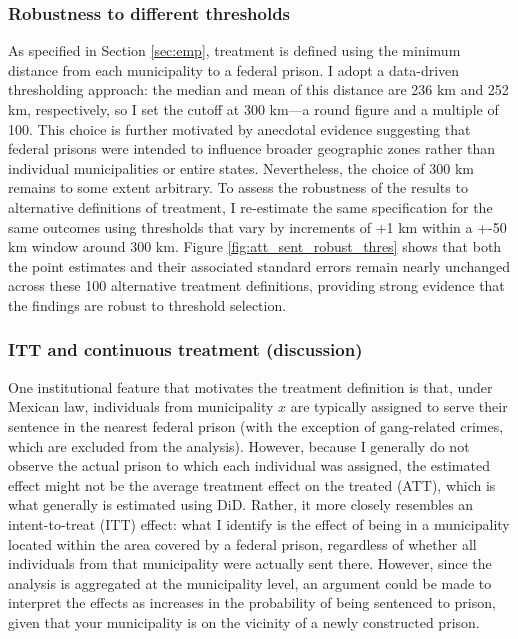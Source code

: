 \subsubsection*{Robustness to different thresholds}

As specified in Section \ref{sec:emp}, treatment is defined using the minimum distance from each municipality to a federal prison. I adopt a data-driven thresholding approach: the median and mean of this distance are 236 km and 252 km, respectively, so I set the cutoff at 300 km—a round figure and a multiple of 100. This choice is further motivated by anecdotal evidence suggesting that federal prisons were intended to influence broader geographic zones rather than individual municipalities or entire states. Nevertheless, the choice of 300 km remains to some extent arbitrary. To assess the robustness of the results to alternative definitions of treatment, I re-estimate the same specification for the same outcomes using thresholds that vary by increments of +1 km within a +-50 km window around 300 km. Figure \ref{fig:att_sent_robust_thres} shows that both the point estimates and their associated standard errors remain nearly unchanged across these 100 alternative treatment definitions, providing strong evidence that the findings are robust to threshold selection. 

\subsubsection*{ITT and continuous treatment (discussion)}

One institutional feature that motivates the treatment definition is that, under Mexican law, individuals from municipality $x$ are typically assigned to serve their sentence in the nearest federal prison (with the exception of gang-related crimes, which are excluded from the analysis). However, because I generally do not observe the actual prison to which each individual was assigned, the estimated effect might not be the average treatment effect on the treated (ATT), which is what generally is estimated using DiD. Rather, it more closely resembles an intent-to-treat (ITT) effect: what I identify is the effect of being in a municipality located within the area covered by a federal prison, regardless of whether all individuals from that municipality were actually sent there. However, since the analysis is aggregated at the municipality level, an argument could be made to interpret the effects as increases in the probability of being sentenced to prison, given that your municipality is on the vicinity of a newly constructed prison.

